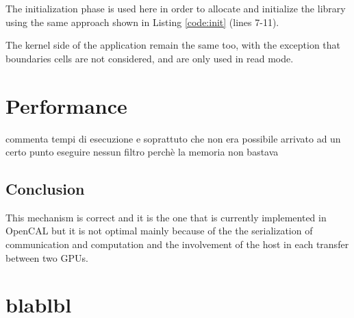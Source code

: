 The initialization phase is used here in order to allocate and initialize the library using the same approach shown in Listing \ref{code:init} (lines 7-11).

The kernel side of the application remain the same too, with the exception that boundaries cells are not considered, and are only used in read mode. 

\section{Performance}
commenta tempi di esecuzione e soprattuto che non era possibile arrivato ad un certo punto eseguire nessun filtro perchè la memoria non bastava


\subsection{Conclusion}
This mechanism is correct and it is the one that is currently implemented in OpenCAL but it is not optimal mainly because of the the serialization of communication and computation and the involvement of the host in each transfer between two GPUs.





\section{blablbl}